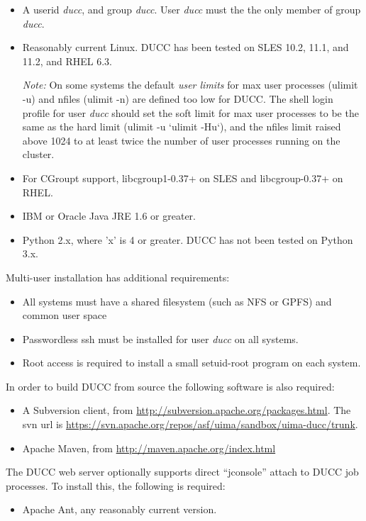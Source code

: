 \begin{itemize}
  \item A userid {\em ducc}, and group {\em ducc}.  User {\em ducc} must the the only member of group {\em ducc}.
  \item Reasonably current Linux.  DUCC has been tested on SLES 10.2, 11.1, and 11.2, and RHEL 6.3.
    
    {\em Note:} On some systems the default {\em user limits}
    for max user processes (ulimit -u) and nfiles (ulimit -n) are defined too
    low for DUCC. The shell login profile for user {\em ducc} should set the
    soft limit for max user processes to be the same as the hard limit
    (ulimit -u `ulimit -Hu`), and
    the nfiles limit raised above 1024 to at least twice the number of user
    processes running on the cluster.

  \item For CGroupt support, libcgroup1-0.37+ on SLES and libcgroup-0.37+ on RHEL.  
  \item IBM or Oracle Java JRE 1.6 or greater.
  \item Python 2.x, where 'x' is 4 or greater.  DUCC has not been tested on Python 3.x.
\end{itemize}
  
Multi-user installation has additional requirements:

\begin{itemize}
  \item All systems must have a shared filesystem (such as NFS or GPFS)  and common user space 
  \item Passwordless ssh must be installed for user {\em ducc} on all systems.
  \item Root access is required to install a small setuid-root program on each system.
\end{itemize}
  
In order to build DUCC from source the following software is also required:
\begin{itemize}
    \item A Subversion client, from \url{http://subversion.apache.org/packages.html}.  The
      svn url is \url{https://svn.apache.org/repos/asf/uima/sandbox/uima-ducc/trunk}.
    \item Apache Maven, from \url{http://maven.apache.org/index.html}
\end{itemize}

The DUCC web server optionally supports direct ``jconsole'' attach to DUCC job processes.  To install
this, the following is required:
\begin{itemize}
    \item Apache Ant, any reasonably current version.
\end{itemize}
    
